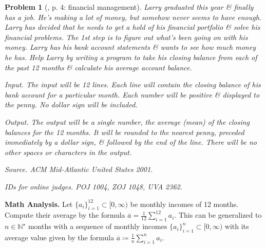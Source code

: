 \documentclass{article}
\newtheorem{problem}{Problem}
\begin{document}
\begin{problem}[\cite{Wu_Wang2016}, p. 4: financial management]
	{\sc Larry} graduated this year \& finally has a job. He's making a lot of money, but somehow never seems to have enough. {\sc Larry} has decided that he needs to get a hold of his financial portfolio \& solve his financial problems. The 1st step is to figure out what's been going on with his money. {\sc Larry} has his bank account statements \& wants to see how much money he has. Help {\sc Larry} by writing a program to take his closing balance from each of the past 12 months \& calculate his average account balance.
	\item {\sf Input.} The input will be 12 lines. Each line will contain the closing balance of his bank account for a particular month. Each number will be positive \& displayed to the penny. No dollar sign will be included.
	\item {\sf Output.} The output will be a single number, the average (mean) of the closing balances for the 12 months. It will be rounded to the nearest penny, preceded immediately by a dollar sign, \& followed by the end of the line. There will be no other spaces or characters in the output.
	\item {\sf Source.} ACM Mid-Atlantic United States 2001.
	\item {\sf IDs for online judges.} POJ 1004, ZOJ 1048, UVA 2362.
\end{problem}
\textbf{\textsf{Math Analysis.}} Let $\{a_i\}_{i=1}^{12}\subset[0,\infty)$ be monthly incomes of 12 months. Compute their average by the formula $\overline{a} = \frac{1}{12}\sum_{i=1}^{12} a_i$. This can be generalized to $n\in\mathbb{N}^\star$ months with a sequence of monthly incomes $\{a_i\}_{i=1}^n\subset[0,\infty)$ with its average value given by the formula $\overline{a}\coloneqq\frac{1}{n}\sum_{i=1}^n a_i$.
\end{document}
